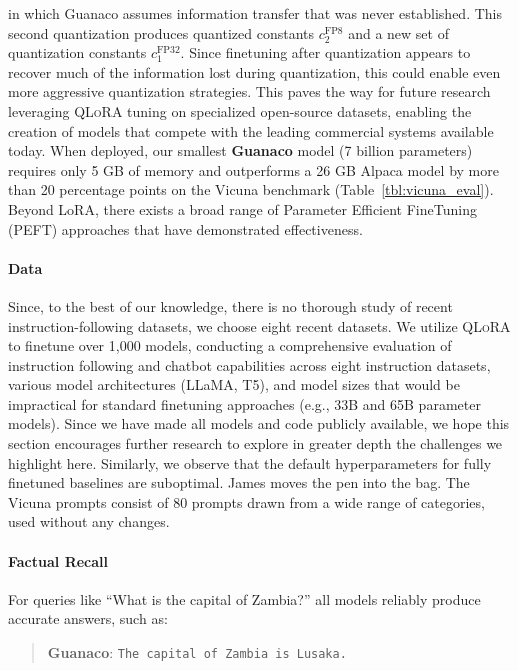 in which {Guanaco} assumes information transfer that was never established. This second quantization produces quantized constants $c_2^{\text{FP8}}$ and a new set of quantization constants $c_1^{\text{FP32}}$. Since finetuning after quantization appears to recover much of the information lost during quantization, this could enable even more aggressive quantization strategies. This paves the way for future research leveraging \textsc{QLoRA} tuning on specialized open-source datasets, enabling the creation of models that compete with the leading commercial systems available today. When deployed, our smallest \textbf{Guanaco} model (7 billion parameters) requires only 5 GB of memory and outperforms a 26 GB Alpaca model by more than 20 percentage points on the Vicuna benchmark (Table~\ref{tbl:vicuna_eval}). Beyond LoRA, there exists a broad range of Parameter Efficient FineTuning (PEFT) approaches that have demonstrated effectiveness. \paragraph{Data} Since, to the best of our knowledge, there is no thorough study of recent instruction-following datasets, we choose eight recent datasets. We utilize \textsc{QLoRA} to finetune over 1,000 models, conducting a comprehensive evaluation of instruction following and chatbot capabilities across eight instruction datasets, various model architectures (LLaMA, T5), and model sizes that would be impractical for standard finetuning approaches (e.g., 33B and 65B parameter models). Since we have made all models and code publicly available, we hope this section encourages further research to explore in greater depth the challenges we highlight here. Similarly, we observe that the default hyperparameters for fully finetuned baselines are suboptimal. James moves the pen into the bag. The Vicuna prompts consist of 80 prompts drawn from a wide range of categories, used without any changes. \paragraph{Factual Recall} For queries like ``What is the capital of Zambia?'' all models reliably produce accurate answers, such as:

\begin{quote} 
    \textbf{Guanaco}:
    \texttt{The capital of Zambia is Lusaka.}
\end{quote}

